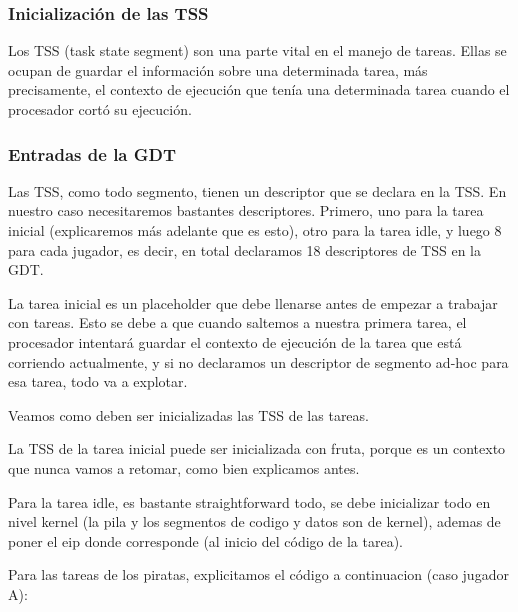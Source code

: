 \subsubsection*{Inicialización de las TSS}

\par Los TSS (task state segment) son una parte vital en el manejo de tareas. Ellas se ocupan de guardar el información sobre una determinada tarea, más precisamente, el contexto de ejecución que tenía una determinada tarea cuando el procesador cortó su ejecución.

\subsubsection*{Entradas de la GDT}

\par Las TSS, como todo segmento, tienen un descriptor que se declara en la TSS. En nuestro caso necesitaremos bastantes descriptores. Primero, uno para la tarea inicial (explicaremos más adelante que es esto), otro para la tarea idle, y luego 8 para cada jugador, es decir, en total declaramos 18 descriptores de TSS en la GDT.

\par La tarea inicial es un placeholder que debe llenarse antes de empezar a trabajar con tareas. Esto se debe a que cuando saltemos a nuestra primera tarea, el procesador intentará guardar el contexto de ejecución de la tarea que está corriendo actualmente, y si no declaramos un descriptor de segmento ad-hoc para esa tarea, todo va a explotar.

\par Veamos como deben ser inicializadas las TSS de las tareas.

\par La TSS de la tarea inicial puede ser inicializada con fruta, porque es un contexto que nunca vamos a retomar, como bien explicamos antes.

\par Para la tarea idle, es bastante straightforward todo, se debe inicializar todo en nivel kernel (la pila y los segmentos de codigo y datos son de kernel), ademas de poner el eip donde corresponde (al inicio del código de la tarea).

\par Para las tareas de los piratas, explicitamos el código a continuacion (caso jugador A):

